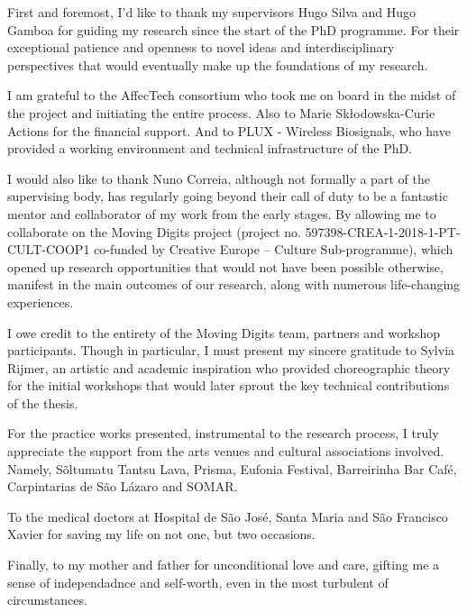 

\begin{ntacknowledgements}

First and foremost, I'd like to thank my supervisors Hugo Silva and Hugo Gamboa for guiding my research since the start of the PhD programme. For their exceptional patience and openness to novel ideas and interdisciplinary perspectives that would eventually make up the foundations of my research.

I am grateful to the AffecTech consortium who took me on board in the midst of the project and initiating the entire process. Also to Marie Skłodowska-Curie Actions for the financial support. And to PLUX - Wireless Biosignals, who have provided a working environment and technical infrastructure of the PhD.

I would also like to thank Nuno Correia, although not formally a part of the supervising body, has regularly going beyond their call of duty to be a fantastic mentor and collaborator of my work from the early stages. By allowing me to collaborate on the Moving Digits project (project no. 597398-CREA-1-2018-1-PT-CULT-COOP1 co-funded by Creative Europe – Culture Sub-programme), which opened up research opportunities that would not have been possible otherwise, manifest in the main outcomes of our research, along with numerous life-changing experiences.

I owe credit to the entirety of the Moving Digits team, partners and workshop participants. Though in particular, I must present my sincere gratitude to Sylvia Rijmer, an artistic and academic inspiration who provided choreographic theory for the initial workshops that would later sprout the key technical contributions of the thesis.

For the practice works presented, instrumental to the research process, I truly appreciate the support from the arts venues and cultural associations involved. Namely, Sõltumatu Tantsu Lava, Prisma, Eufonia Festival, Barreirinha Bar Café, Carpintarias de São Lázaro and SOMAR.

To the medical doctors at Hospital de São José, Santa Maria and São Francisco Xavier for saving my life on not one, but two occasions.

Finally, to my mother and father for unconditional love and care, gifting me a sense of independadnce and self-worth, even in the most turbulent of circumstances.

\end{ntacknowledgements}
